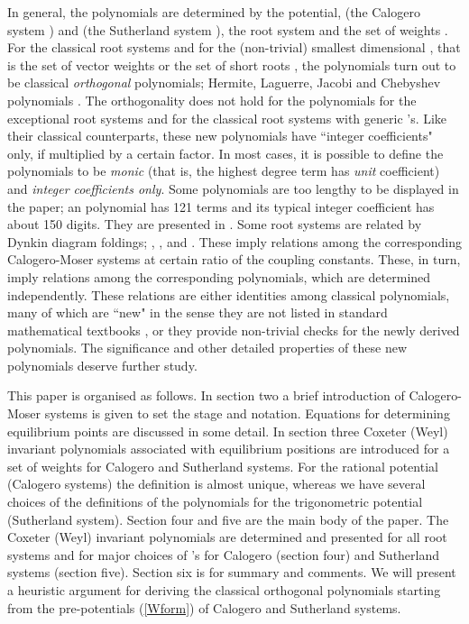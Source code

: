 \documentclass[a4paper,12pt]{article}
\begin{document}
In general, the polynomials are determined by the potential,
\coordHE{} (the Calogero system \cite{Cal}) and \coordHE{} (the
Sutherland system \cite{Sut}), the root system \myHighlight{$\Delta$}\coordHE{}
and the set of weights \coordHE{}. For the classical root systems and for
the (non-trivial) smallest dimensional \coordHE{}, that is the set of
vector weights \coordHE{} or the set of short roots \coordHE{},
the polynomials turn out to be classical {\em orthogonal\/}
polynomials; Hermite, Laguerre, Jacobi and Chebyshev polynomials \cite{szego}.
The orthogonality does not hold for the polynomials for the exceptional root
systems and for the classical root systems with generic \coordHE{}'s.
Like their classical counterparts, these new polynomials
have ``integer coefficients" only, if multiplied by a certain factor.
In most cases, it is possible to define the polynomials to be {\em
monic\/} (that is, the  highest degree term has {\em unit\/}
coefficient) and {\em integer coefficients only}.
Some polynomials are too lengthy to be displayed in the paper;
an \coordHE{} polynomial has 121 terms and its  typical integer
coefficient has about 150 digits. They are presented in \cite{poly}.
Some root systems are related by Dynkin diagram foldings;
\coordHE{}, \coordHE{}, \coordHE{} and \coordHE{}.
These imply relations among the corresponding Calogero-Moser systems
at certain ratio of the coupling constants. These, in turn, imply
relations among the corresponding polynomials, which are determined
independently. These relations are either  identities among
classical polynomials, many of which are ``new" in the sense they are not
listed in standard mathematical textbooks \cite{szego}, or they provide 
non-trivial checks for the newly
derived polynomials. The significance and other detailed properties of
these new polynomials deserve further study.

This paper is organised as follows.
In section two a brief introduction of Calogero-Moser systems is given to
set the stage and notation. Equations for determining equilibrium points
are discussed in some detail.
In section three Coxeter (Weyl) invariant polynomials associated with
equilibrium positions are introduced for a set of weights \coordHE{}
for Calogero and Sutherland systems. For the rational potential (Calogero
systems) the definition is almost unique, whereas we have several choices
of the definitions of the polynomials for the trigonometric potential
(Sutherland system). Section four and five are the main body of the paper.
The Coxeter (Weyl) invariant polynomials are determined and presented for all
root systems \myHighlight{$\Delta$}\coordHE{} and for major choices of \coordHE{}'s for Calogero
(section four) and Sutherland systems (section five). Section six
is for summary and comments. We will present a heuristic argument for
deriving the classical orthogonal polynomials starting from the
pre-potentials (\ref{Wform}) of Calogero and Sutherland systems.
\end{document}
